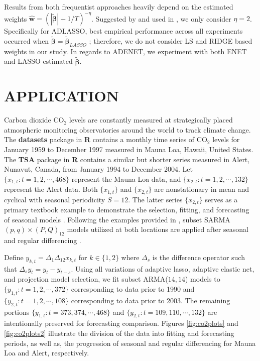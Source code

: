 Results from both frequentist approaches heavily depend on the estimated weights $\hat{\bm{w}}=(|\tilde{\bm{\beta}}|+1/T)^{-\eta}$. Suggested by \cite{Zou2006} and used in \cite{Chen2011}, we only consider $\eta=2$. Specifically for ADLASSO, best empirical performance across all experiments occurred when $\tilde{\bm{\beta}}=\tilde{\bm{\beta}}_{LASSO}$ \citep{Chen2011}; therefore, we do not consider LS and RIDGE based weights in our study. In regards to ADENET, we experiment with both ENET and LASSO estimated $\tilde{\bm{\beta}}$.





\section{APPLICATION}
\label{sec:co2app}
Carbon dioxide $\textrm{CO}_2$ levels are constantly measured at strategically placed atmospheric monitoring observatories around the world to track climate change. The {\bf datasets} package in {\bf R} \citep{RCORETEAM} contains a monthly time series of  $\textrm{CO}_2$ levels for January 1959 to December 1997 measured in Mauna Loa, Hawaii, United States. The {\bf TSA} package in {\bf R} \citep{RTSA} contains a similar but shorter series  measured  in Alert, Nunavut, Canada, from January 1994 to December 2004. Let $\{x_{1,t}:t=1,2,\cdots,468\}$ represent the Mauna Loa data, and $\{x_{2,t}:t=1,2,\cdots,132\}$ represent the Alert data. Both $\{x_{1,t}\}$ and $\{x_{2,t}\}$ are nonstationary in mean and cyclical with seasonal periodicity $S=12$. The latter series $\{x_{2,t}\}$ serves as a primary textbook example  to demonstrate the selection, fitting, and forecasting of seasonal models \citep{Cryer2008}. Following the examples provided in \cite{Cryer2008,Chen2011}, subset SARMA$(p,q)\times(P,Q)_{12}$ models utilized at both locations are applied after seasonal and regular differencing . 

Define $y_{k,t}=\Delta_1\Delta_{12}x_{k,t}$ for $k\in\{1,2\}$  where $\Delta_s$ is the difference operator such that $\Delta_s y_t=y_t-y_{t-s}$.  Using all variations of adaptive lasso, adaptive elastic net, and projection model selection, we fit subset ARMA($14,14$) models to $\{y_{1,t}:t=1,2,\cdots,372\}$ corresponding to data prior to 1990 and $\{y_{2,t}:t=1,2,\cdots,108\}$ corresponding to data prior to 2003. The remaining portions $\{y_{1,t}:t=373,374,\cdots,468\}$ and $\{y_{2,t}:t=109,110,\cdots,132\}$ are intentionally preserved for forecasting comparison. Figures \ref{fig:co2plots} and \ref{fig:co2plots2} illustrate the division of the data into fitting and forecasting periods, as well as, the progression of seasonal and regular differencing for Mauna Loa and Alert, respectively.

